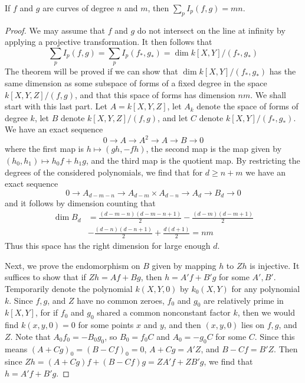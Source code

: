 \begin{theorem}
    If $f$ and $g$ are curves of degree $n$ and $m$, then $\sum_p I_p(f,g) = mn$.
\end{theorem}
\begin{proof}
    We may assume that $f$ and $g$ do not intersect on the line at infinity by applying a projective transformation. It then follows that
    \[ \sum_p I_p(f,g) = \sum_p I_p(f_*,g_*) = \dim k[X,Y]/(f_*,g_*) \]
    The theorem will be proved if we can show that $\dim k[X,Y]/(f_*,g_*)$ has the same dimension as some subspace of forms of a fixed degree in the space $k[X,Y,Z]/(f,g)$, and that this space of forms has dimension $nm$. We shall start with this last part. Let $A = k[X,Y,Z]$, let $A_k$ denote the space of forms of degree $k$, let $B$ denote $k[X,Y,Z]/(f,g)$, and let $C$ denote $k[X,Y]/(f_*,g_*)$. We have an exact sequence
    \[ 0 \to A \to A^2 \to A \to B \to 0 \]
    where the first map is $h \mapsto (gh,-fh)$, the second map is the map given by $(h_0,h_1) \mapsto h_0f + h_1g$, and the third map is the quotient map. By restricting the degrees of the considered polynomials, we find that for $d \geq n + m$ we have an exact sequence
    \[ 0 \to A_{d-m-n} \to A_{d-m} \times A_{d-n} \to A_d \to B_d \to 0 \]
    and it follows by dimension counting that
    \begin{align*}
        \dim B_d &= \frac{(d-m-n)(d-m-n+1)}{2} - \frac{(d-m)(d-m+1)}{2}\\
        &- \frac{(d-n)(d-n+1)}{2} + \frac{d(d+1)}{2} = nm
    \end{align*}
    Thus this space has the right dimension for large enough $d$.

    Next, we prove the endomorphism on $B$ given by mapping $h$ to $Zh$ is injective. It suffices to show that if $Zh = Af + Bg$, then $h = A'f + B'g$ for some $A',B'$. Temporarily denote the polynomial $k(X,Y,0)$ by $k_0(X,Y)$ for any polynomial $k$. Since $f,g$, and $Z$ have no common zeroes, $f_0$ and $g_0$ are relatively prime in $k[X,Y]$, for if $f_0$ and $g_0$ shared a common nonconstant factor $k$, then we would find $k(x,y,0) = 0$ for some points $x$ and $y$, and then $(x,y,0)$ lies on $f,g$, and $Z$. Note that $A_0f_0 = -B_0g_0$, so $B_0 = f_0C$ and $A_0 = -g_0C$ for some $C$. Since this means $(A + Cg)_0 = (B - Cf)_0 = 0$, $A + Cg = A'Z$, and $B - Cf = B'Z$. Then since $Zh = (A + Cg)f + (B-Cf)g = ZA'f + ZB'g$, we find that $h = A'f + B'g$.


\end{proof}
